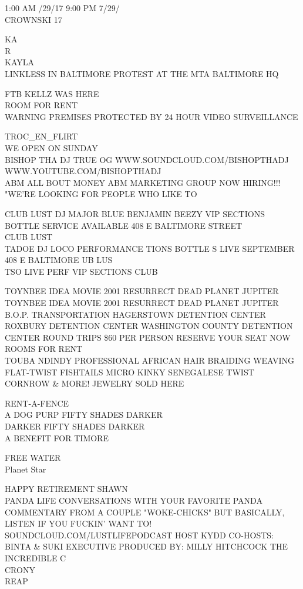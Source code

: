 \documentclass[10pt,letterpaper]{article}
\begin{document}
1:00 AM /29/17 9:00 PM 7/29/\\
CROWNSKI 17

KA\\
R\\
KAYLA\\
LINKLESS IN BALTIMORE PROTEST AT THE MTA BALTIMORE HQ

FTB KELLZ WAS HERE\\
ROOM FOR RENT\\
WARNING PREMISES PROTECTED BY 24 HOUR VIDEO SURVEILLANCE

TROC\_EN\_FLIRT\\
WE OPEN ON SUNDAY\\
BISHOP THA DJ TRUE OG WWW.SOUNDCLOUD.COM/BISHOPTHADJ WWW.YOUTUBE.COM/BISHOPTHADJ\\
ABM ALL BOUT MONEY ABM MARKETING GROUP NOW HIRING!!! "WE'RE LOOKING FOR PEOPLE WHO LIKE TO

CLUB LUST DJ MAJOR BLUE BENJAMIN BEEZY VIP SECTIONS BOTTLE SERVICE AVAILABLE 408 E BALTIMORE STREET\\
CLUB LUST\\
TADOE DJ LOCO PERFORMANCE TIONS BOTTLE S LIVE SEPTEMBER 408 E BALTIMORE UB LUS\\
TSO LIVE PERF VIP SECTIONS CLUB

TOYNBEE IDEA MOVIE 2001 RESURRECT DEAD PLANET JUPITER TOYNBEE IDEA MOVIE 2001 RESURRECT DEAD PLANET JUPITER\\
B.O.P. TRANSPORTATION HAGERSTOWN DETENTION CENTER ROXBURY DETENTION CENTER WASHINGTON COUNTY DETENTION CENTER ROUND TRIPS \$60 PER PERSON RESERVE YOUR SEAT NOW\\
ROOMS FOR RENT\\
TOUBA NDINDY PROFESSIONAL AFRICAN HAIR BRAIDING WEAVING FLAT{-}TWIST FISHTAILS MICRO KINKY SENEGALESE TWIST CORNROW \& MORE!  JEWELRY SOLD HERE

RENT{-}A{-}FENCE\\
A DOG PURP FIFTY SHADES DARKER\\
DARKER FIFTY SHADES DARKER\\
A BENEFIT FOR TIMORE

FREE WATER\\
Planet Star

HAPPY RETIREMENT SHAWN\\
PANDA LIFE CONVERSATIONS WITH YOUR FAVORITE PANDA COMMENTARY FROM A COUPLE "WOKE{-}CHICKS" BUT BASICALLY, LISTEN IF YOU FUCKIN' WANT TO!  SOUNDCLOUD.COM/LUSTLIFEPODCAST HOST KYDD CO{-}HOSTS: BINTA \& SUKI EXECUTIVE PRODUCED BY: MILLY HITCHCOCK THE INCREDIBLE C\\
CRONY\\
REAP
\end{document}
